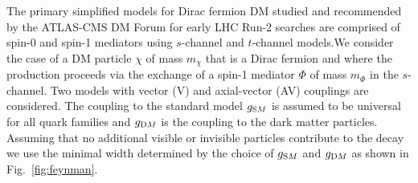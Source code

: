 







The primary simplified models for Dirac fermion DM studied and recommended by the ATLAS-CMS DM Forum for early LHC Run-2 searches are comprised of spin-0 and spin-1 mediators using $s$-channel and $t$-channel models.We consider the case of a DM particle $\chi$ of mass $m_{\chi}$ that is a Dirac fermion and where the production proceeds via the exchange of a spin-1 mediator $\Phi$ of mass $m_{\Phi}$ in the $s$-channel. Two models with vector (V) and axial-vector (AV) couplings are considered. The coupling to the standard model $g_{\textrm SM}$ is assumed to be universal for all quark families and $g_{\textrm DM}$ is the coupling to the dark matter particles. Assuming that no additional visible or invisible particles contribute to the decay we use the minimal width determined by the choice of $g_{\textrm SM}$ and $g_{\textrm DM}$ as shown in Fig.~\ref{fig:feynman}.

